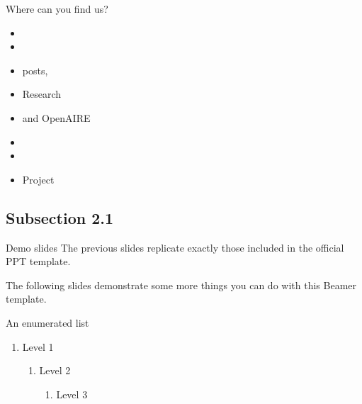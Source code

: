 \documentclass[12pt, t]{beamer}
\begin{document}
\begin{frame}{Where can you find us?}
    \begin{itemize}
        \item {}
		\item {}
		\item {} posts, 
		\item Research 
		\item {} and OpenAIRE
		\item {}
		\item {}
		\item Project 
    \end{itemize}
\end{frame}



\subsection{Subsection 2.1}

\begin{frame}{Demo slides}
    The previous slides replicate exactly those included in the official
	PPT template.
	\vspace{1cm}

	The following slides demonstrate some more things you can
	do with this Beamer template.
\end{frame}


\begin{frame}{An enumerated list}
    \begin{enumerate}
        \item Level 1
        \begin{enumerate}
            \item Level 2
            \begin{enumerate}
                \item Level 3
            \end{enumerate}
        \end{enumerate}
    \end{enumerate}
\end{frame}
\end{document}
